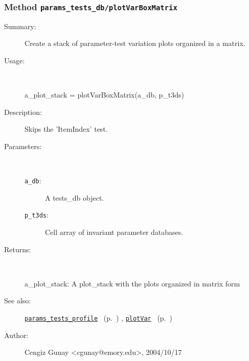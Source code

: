\subsubsection[Method \texttt{plotVarBoxMatrix}]{Method \texttt{params\_tests\_db/plotVarBoxMatrix}}%
%
\label{ref_params_tests_db__plotVarBoxMatrix}%
\hypertarget{ref_params_tests_db__plotVarBoxMatrix}{}%
\begin{description}
\item[Summary:]Create a stack of parameter-test variation plots 
		organized in a matrix.
%
\item[Usage:]~%
\begin{lyxcode}%
a\_plot\_stack = plotVarBoxMatrix(a\_db, p\_t3ds)
%
\end{lyxcode}%
%
\item[Description:]%
Skips the 'ItemIndex' test.
\item[Parameters:]~
\begin{description}%
\item[\texttt{a\_db}:]
 A tests\_db object.
\item[\texttt{p\_t3ds}:]
 Cell array of invariant parameter databases.
\end{description}%
%
\item[Returns:]~

	a\_plot\_stack: A plot\_stack with the plots organized in matrix form
%
%
\item[See also:]%
\hyperlink{ref_params_tests_profile}{\texttt{params\_tests\_profile}}%
\ (p.~\pageref{ref_params_tests_profile})%
%
, \hyperlink{ref_plotVar}{\texttt{plotVar}}%
\ (p.~\pageref{ref_plotVar})%
%
%
\item[Author:]%
Cengiz Gunay <cgunay@emory.edu>, 2004/10/17%
\end{description}
\methodline%
